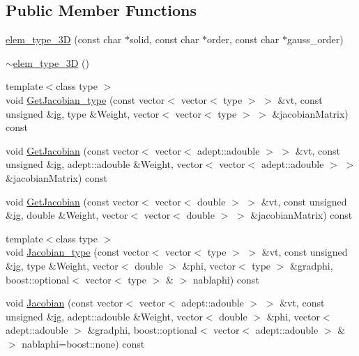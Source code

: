 \subsection*{Public Member Functions}
\begin{DoxyCompactItemize}
\item 
\mbox{\hyperlink{classfemus_1_1elem__type__3_d_a218cb9c26e839084933a2e6af9f30443}{elem\+\_\+type\+\_\+3D}} (const char $\ast$solid, const char $\ast$order, const char $\ast$gauss\+\_\+order)
\item 
\mbox{\hyperlink{classfemus_1_1elem__type__3_d_acf28faffa2f92f63636478526f08a387}{$\sim$elem\+\_\+type\+\_\+3D}} ()
\item 
{\footnotesize template$<$class type $>$ }\\void \mbox{\hyperlink{classfemus_1_1elem__type__3_d_adcb67b007b859b8efef1e35f52ef99c8}{Get\+Jacobian\+\_\+type}} (const vector$<$ vector$<$ type $>$ $>$ \&vt, const unsigned \&\mbox{\hyperlink{namespacefemus_a6df31099f676311de214a312d7043941}{ig}}, type \&Weight, vector$<$ vector$<$ type $>$ $>$ \&jacobian\+Matrix) const
\item 
void \mbox{\hyperlink{classfemus_1_1elem__type__3_d_ada0cc038990bffab6a4bc3d1d23f057f}{Get\+Jacobian}} (const vector$<$ vector$<$ adept\+::adouble $>$ $>$ \&vt, const unsigned \&\mbox{\hyperlink{namespacefemus_a6df31099f676311de214a312d7043941}{ig}}, adept\+::adouble \&Weight, vector$<$ vector$<$ adept\+::adouble $>$ $>$ \&jacobian\+Matrix) const
\item 
void \mbox{\hyperlink{classfemus_1_1elem__type__3_d_aacb6b130a8421fe901505f6d61ad8ddd}{Get\+Jacobian}} (const vector$<$ vector$<$ double $>$ $>$ \&vt, const unsigned \&\mbox{\hyperlink{namespacefemus_a6df31099f676311de214a312d7043941}{ig}}, double \&Weight, vector$<$ vector$<$ double $>$ $>$ \&jacobian\+Matrix) const
\item 
{\footnotesize template$<$class type $>$ }\\void \mbox{\hyperlink{classfemus_1_1elem__type__3_d_a8188e7f5aea4cbc3c6ad70d5b14aab4c}{Jacobian\+\_\+type}} (const vector$<$ vector$<$ type $>$ $>$ \&vt, const unsigned \&\mbox{\hyperlink{namespacefemus_a6df31099f676311de214a312d7043941}{ig}}, type \&Weight, vector$<$ double $>$ \&phi, vector$<$ type $>$ \&gradphi, boost\+::optional$<$ vector$<$ type $>$ \& $>$ nablaphi) const
\item 
void \mbox{\hyperlink{classfemus_1_1elem__type__3_d_a6ba1c6d58757d317c455e9041bdb1970}{Jacobian}} (const vector$<$ vector$<$ adept\+::adouble $>$ $>$ \&vt, const unsigned \&\mbox{\hyperlink{namespacefemus_a6df31099f676311de214a312d7043941}{ig}}, adept\+::adouble \&Weight, vector$<$ double $>$ \&phi, vector$<$ adept\+::adouble $>$ \&gradphi, boost\+::optional$<$ vector$<$ adept\+::adouble $>$ \& $>$ nablaphi=boost\+::none) const

\end{DoxyCompactItemize}
